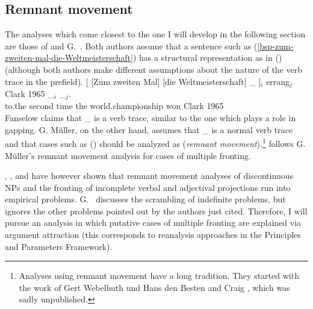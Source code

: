 



\subsection{Remnant movement}


The analyses which come closest to the one I will develop in the following section are those of
\citet{Fanselow93a} and G.\ \citet[Chapter~5.3]{GMueller98a}. Both authors assume that a sentence such as
(\ref{bsp-zum-zweiten-mal-die-Weltmeisterschaft}) has a structural representation as in () (although
both authors make different assumptions about the nature of the verb trace in the prefield).
\ea
\gll {}[ [Zum zweiten Mal] [die Weltmeisterschaft] \_ ]$_i$ errang$_j$ Clark 1965 \_$_i$ \_$_j$.\\
     {}          \spacebr{}to.the second time  \spacebr{}the world.championship {} {} won Clark 1965\\
\z
Fanselow claims that \_ is a verb trace, similar to the one which plays a role in gapping. G. Müller,
on the other hand, assumes that \_ is a normal verb trace and that cases such as () should be analyzed
as (\emph{remnant movement}).\footnote{
        Analyses using remnant movement have a long tradition. They started with the work of
		Gert Webelhuth und Hans den Besten \citeyearpar{WdB87a}
        and Craig \citet{Thiersch86a}, which was sadly unpublished.%
}
\citet[Abschnitt~7]{Fanselow2002a} follows G. Müller's remnant movement analysis for cases of multiple fronting.

\citet[]{Haider93a}, \citet{deKuthy2002a}, \citet{dKM2001a} and
\citet{Fanselow2002a} have however shown that remnant movement analyses of discontinuous NPs and the fronting of incomplete
verbal and adjectival projections run into empirical problems. G.\ \citet{GMueller2014a-u} discusses the scrambling of indefinite problems, but ignores the other problems pointed out by the authors just cited. Therefore, I will pursue an analysis in which 
putative cases of multiple fronting are explained via argument attraction (this corresponds to reanalysis approaches
in the Principles and Parameters Framework). 





